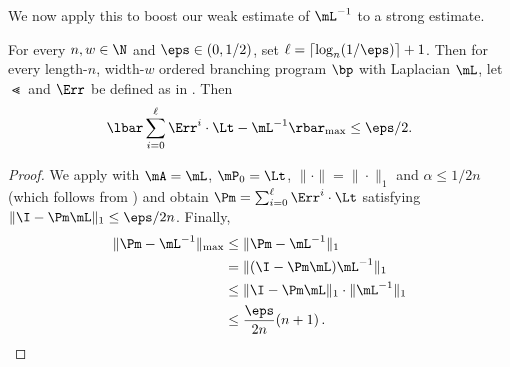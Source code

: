 \documentclass{toc}
\begin{document}
We now apply this to boost our weak estimate of $\mL^{-1}$ to a strong estimate.
\begin{lemma}
\label{lem:pathStrongErr}
For every $n,w\in \N$ and $\eps \in (0,1/2)$, set $\ell=\lceil \log_{n}(1/\eps)\rceil+1$. Then for every length-$n$, width-$w$ ordered branching program $\bp$ with Laplacian $\mL$, let $\Lt$ and $\Err$ be defined as in . Then
$$\lbar\sum_{i=0}^{\ell}\Err^i\cdot \Lt-\mL^{-1}\rbar_{\max}\leq \eps/2.$$
\end{lemma}
\begin{proof}
We apply  with $\mA=\mL$, $\mP_0=\Lt$, $\|\cdot\|=\|\cdot\|_1$ and $\alpha\leq 1/2n$ (which follows from ) and obtain $\Pm=\sum_{i=0}^{\ell}\Err^i\cdot \Lt$ satisfying $\|\I-\Pm\mL\|_1\leq \eps/2n$. Finally,
\begin{align*}
    \|\Pm-\mL^{-1}\|_{\max} &\leq \|\Pm-\mL^{-1}\|_1\\ 
    &= \|(\I-\Pm \mL)\mL^{-1}\|_1\\
    &\leq \|\I-\Pm\mL\|_1\cdot \|\mL^{-1}\|_1\\
    &\leq \frac{\eps}{2n}(n+1)\,. \qedhere
\end{align*}
\end{proof}
\end{document}
